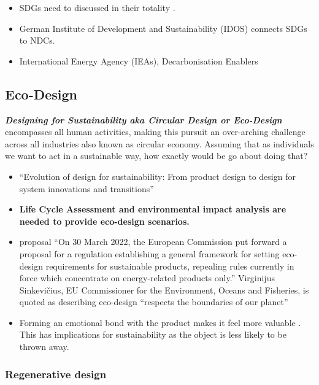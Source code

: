 \documentclass[
  letterpaper,
  DIV=11,
  numbers=noendperiod]{scrartcl}
\begin{document}
\begin{itemize}
\item
  SDGs need to discussed in their totality
  \citet{popkovaTheoryDigitalTechnology2022}.
\item
  German Institute of Development and Sustainability (IDOS) connects
  SDGs to NDCs. \citet{dzeboParisAgreementSustainable2023}
\item
  International Energy Agency (IEAs), Decarbonisation Enablers
  \citet{ieaTrackingCleanEnergy2023}
\end{itemize}

\subsection{Eco-Design}\label{eco-design}

\textbf{\emph{Designing for Sustainability aka Circular Design or
Eco-Design}} encompasses all human activities, making this pursuit an
over-arching challenge across all industries also known as circular
economy. Assuming that as individuals we want to act in a sustainable
way, how exactly would be go about doing that?

\begin{itemize}
\item
  ``Evolution of design for sustainability: From product design to
  design for system innovations and transitions''
\item
  \citet{DELAPUENTEDIAZDEOTAZU2022718} \textbf{Life Cycle Assessment and
  environmental impact analysis are needed to provide eco-design
  scenarios.}
\item
  \citet{europeanparliamentEcodesignSustainableProducts2022} proposal
  ``On 30 March 2022, the European Commission put forward a proposal for
  a regulation establishing a general framework for setting eco-design
  requirements for sustainable products, repealing rules currently in
  force which concentrate on energy-related products only.'' Virginijus
  Sinkevičius, EU Commissioner for the Environment, Oceans and
  Fisheries, is quoted as describing eco-design ``respects the
  boundaries of our planet'' \citet{europeancommissionGreenDealNew2022}
\item
  Forming an emotional bond with the product makes it feel more valuable
  \citep{zonneveldEmotionalConnectionsObjects2014}. This has
  implications for sustainability as the object is less likely to be
  thrown away.
\end{itemize}

\subsubsection{Regenerative design}\label{regenerative-design}
\end{document}
